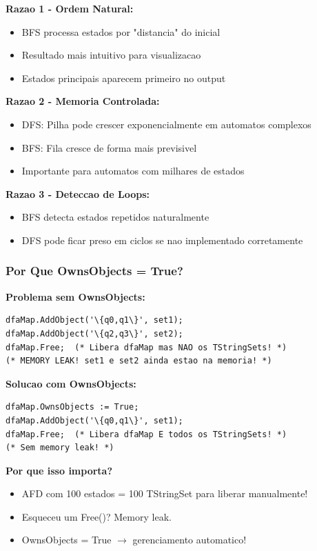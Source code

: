\documentclass[12pt,a4paper]{article}
\begin{document}
\textbf{Razao 1 - Ordem Natural:}
\begin{itemize}
    \item BFS processa estados por "distancia" do inicial
    \item Resultado mais intuitivo para visualizacao
    \item Estados principais aparecem primeiro no output
\end{itemize}

\textbf{Razao 2 - Memoria Controlada:}
\begin{itemize}
    \item DFS: Pilha pode crescer exponencialmente em automatos complexos
    \item BFS: Fila cresce de forma mais previsivel
    \item Importante para automatos com milhares de estados
\end{itemize}

\textbf{Razao 3 - Deteccao de Loops:}
\begin{itemize}
    \item BFS detecta estados repetidos naturalmente
    \item DFS pode ficar preso em ciclos se nao implementado corretamente
\end{itemize}

\subsubsection{Por Que OwnsObjects = True?}

\textbf{Problema sem OwnsObjects:}
\begin{lstlisting}[style=pascal]
dfaMap.AddObject('\{q0,q1\}', set1);
dfaMap.AddObject('\{q2,q3\}', set2);
dfaMap.Free;  (* Libera dfaMap mas NAO os TStringSets! *)
(* MEMORY LEAK! set1 e set2 ainda estao na memoria! *)
\end{lstlisting}

\textbf{Solucao com OwnsObjects:}
\begin{lstlisting}[style=pascal]
dfaMap.OwnsObjects := True;
dfaMap.AddObject('\{q0,q1\}', set1);
dfaMap.Free;  (* Libera dfaMap E todos os TStringSets! *)
(* Sem memory leak! *)
\end{lstlisting}

\textbf{Por que isso importa?}
\begin{itemize}
    \item AFD com 100 estados = 100 TStringSet para liberar manualmente!
    \item Esqueceu um Free()? Memory leak.
    \item OwnsObjects = True $\rightarrow$ gerenciamento automatico!
\end{itemize}
\end{document}
